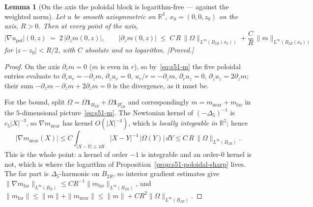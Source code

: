 \documentclass[11pt]{article}
\newtheorem{lemma}[theorem]{Lemma}
\theoremstyle{definition}
\theoremstyle{remark}
\newcommand{\R}{\mathbb{R}}
\begin{document}
\begin{lemma}[On the axis the poloidal block is logarithm-free --- against the
  weighted norm]\label{lem:s51-axis-logfree}
  Let $u$ be smooth axisymmetric on $\R^3$, $x_0=(0,0,z_0)$ on the axis,
  $R>0$. Then at every point of the axis,
  \[
    \bigl|\nabla u_{\mathrm{pol}}\bigr|(0,z)
    \;=\; 2\,\bigl|\partial_zm(0,z)\bigr|,
    \qquad
    \bigl|\partial_zm(0,z)\bigr|
    \;\leq\; C\,R\,\|\Omega\|_{L^\infty(B_{2R}(x_0))}
      + \frac{C}{R}\,\|m\|_{L^\infty(B_{2R}(x_0))}
  \]
  for $|z-z_0|<R/2$, with $C$ absolute and no logarithm.
  \emph{[Proved.]}
\end{lemma}
\begin{proof}
  On the axis $\partial_rm=0$ ($m$ is even in $r$), so by~\eqref{eq:s51-m}
  the five poloidal entries evaluate to
  $\partial_ru_r=-\partial_zm$, $\partial_zu_r=0$, $u_r/r=-\partial_zm$,
  $\partial_ru_z=0$, $\partial_zu_z=2\partial_zm$; their sum
  $-\partial_zm-\partial_zm+2\partial_zm=0$ is the divergence, as it must be.

  For the bound, split $\Omega=\Omega\mathbf{1}_{B_{2R}}+\Omega\mathbf{1}_{B_{2R}^c}$
  and correspondingly $m=m_{\mathrm{near}}+m_{\mathrm{far}}$ in the
  $5$-dimensional picture~\eqref{eq:s51-m}. The Newtonian kernel of
  $(-\Delta_5)^{-1}$ is $c_5|X|^{-3}$, so
  $\nabla m_{\mathrm{near}}$ has kernel $O(|X|^{-4})$, which is
  \emph{locally integrable in $\R^5$}; hence
  \[
    |\nabla m_{\mathrm{near}}(X)|
    \leq C\!\!\int_{|X-Y|\leq4R}\!\!|X-Y|^{-4}\,|\Omega(Y)|\,dY
    \leq C\,R\,\|\Omega\|_{L^\infty(B_{2R})}.
  \]
  This is the whole point: a kernel of order $-1$ is integrable and an order-$0$
  kernel is not, which is where the logarithm of
  Proposition~\ref{prop:s51-poloidal-sharp} lives. The far part is
  $\Delta_5$-harmonic on $B_{2R}$, so interior gradient estimates give
  $\|\nabla m_{\mathrm{far}}\|_{L^\infty(B_R)}\leq CR^{-1}
  \|m_{\mathrm{far}}\|_{L^\infty(B_{2R})}$, and
  $\|m_{\mathrm{far}}\|\leq\|m\|+\|m_{\mathrm{near}}\|
   \leq\|m\|+CR^2\|\Omega\|_{L^\infty(B_{2R})}$.
\end{proof}
\end{document}
